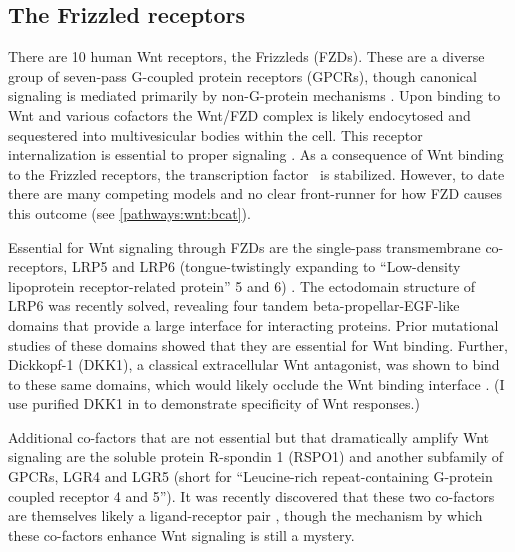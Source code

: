 

	
	
	
	
	
	
\subsection{The Frizzled receptors}
\label{pathways:wnt:frizzled}



There are 10 human Wnt receptors, the Frizzleds (FZDs).
These are a diverse group of seven-pass G-coupled
protein receptors (GPCRs), though canonical signaling is mediated
primarily by non-G-protein mechanisms \cite{Angers2009}.
Upon binding to Wnt and various cofactors
the Wnt/FZD complex is likely endocytosed and
sequestered into multivesicular bodies within the cell. This receptor
internalization is essential to proper signaling
\cite{MacDonald2009,Taelman2010}. As a consequence of Wnt binding
to the Frizzled receptors, the transcription factor \bcat\
is stabilized. However, to date there are many competing
models and no clear front-runner for how FZD causes this outcome
(see \autoref{pathways:wnt:bcat}).


Essential for Wnt signaling through FZDs are the single-pass
transmembrane co-receptors, LRP5 and LRP6 (tongue-twistingly
expanding to ``Low-density lipoprotein receptor-related protein'' 5 and 6)
\cite{Clevers2006}. The ectodomain structure of LRP6 was recently
solved, revealing four tandem
beta-propellar-EGF-like domains that provide a large interface
for interacting proteins. Prior mutational studies of these domains
showed that they are essential for Wnt binding. Further, Dickkopf-1
(DKK1), a classical extracellular Wnt antagonist, was shown to bind
to these same domains, which would likely occlude the Wnt binding interface
\cite{Chen2011,Ahn2011,Cheng2011}. (I use purified DKK1 in
 to demonstrate specificity of Wnt responses.)


Additional co-factors that are not essential but that dramatically
amplify Wnt signaling are the soluble protein R-spondin 1 (RSPO1)
\cite{Kim2005} and 
another subfamily of GPCRs, LGR4 and LGR5
(short for ``Leucine-rich repeat-containing G-protein coupled receptor
4 and 5''). It was recently discovered that these two co-factors
are themselves likely a ligand-receptor pair
\cite{Kim2005,Glinka2011,DeLau2011}, though the mechanism by which these co-factors
enhance Wnt signaling is still a mystery.


